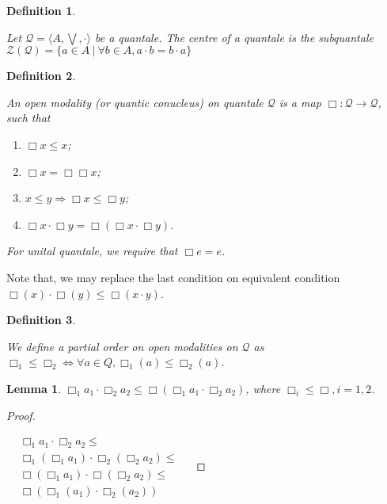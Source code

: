 \documentclass[a4paper]{article}
\theoremstyle{defin}
\newtheorem{defin}{Definition}
\theoremstyle{theorem}
\theoremstyle{prop}
\theoremstyle{lemma}
\newtheorem{lemma}{Lemma}
\theoremstyle{ex}
\theoremstyle{col}
\begin{document}
\begin{defin}
$ $

  Let $\mathcal{Q} = \langle A, \bigvee, \cdot \rangle$ be a quantale.
  The centre of a quantale is the subquantale $\mathcal{Z}(\mathcal{Q}) = \{ a \in A \: | \: \forall b \in A, a \cdot b = b \cdot a \}$
\end{defin}

\begin{defin}
$ $

  An open modality (or quantic conucleus) on quantale $\mathcal{Q}$ is a map $\Box : \mathcal{Q} \to \mathcal{Q}$, such that

\begin{enumerate}
  \item $\Box x \leq x$;
  \item $\Box x = \Box \Box x$;
  \item $x \leq y \Rightarrow \Box x \leq \Box y$;
  \item $\Box x \cdot \Box y = \Box (\Box x \cdot \Box y)$.
\end{enumerate}

For unital quantale, we require that $\Box e = e$.
\end{defin}

Note that, we may replace the last condition on equivalent condition $\Box (x) \cdot \Box (y) \leq \Box (x \cdot y)$.

\begin{defin}
$ $

  We define a partial order on open modalities on $\mathcal{Q}$ as $\Box_1 \leq \Box_2 \Leftrightarrow \forall a \in Q, \Box_1 (a) \leq \Box_2 (a)$.
\end{defin}

\begin{lemma}
  $\Box_1 a_1 \cdot \Box_2 a_2 \leq \Box (\Box_1 a_1 \cdot \Box_2 a_2)$, where $\Box_i \leq \Box, i = 1,2$.
\end{lemma}

\begin{proof}
$ $

  $\begin{array}{lll}
  &\Box_1 a_1 \cdot \Box_2 a_2 \leq & \\
  &\Box_1 (\Box_1 a_1) \cdot \Box_2 (\Box_2 a_2) \leq & \\
  &\Box (\Box_1 a_1) \cdot \Box (\Box_2 a_2) \leq & \\
  &\Box (\Box_1 (a_1) \cdot \Box_2 (a_2))&
  \end{array}$
\end{proof}
\end{document}
